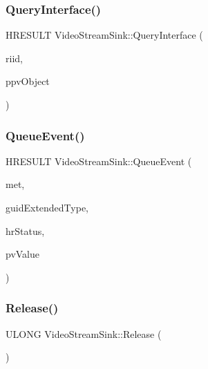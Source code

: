 \mbox{\label{class_video_stream_sink_aab479e5acecb695b0fdc04116ea4b985}} 
\subsubsection{\texorpdfstring{Query\+Interface()}{QueryInterface()}}
{\footnotesize\ttfamily H\+R\+E\+S\+U\+LT Video\+Stream\+Sink\+::\+Query\+Interface (\begin{DoxyParamCaption}\item[{R\+E\+F\+I\+ID}]{riid,  }\item[{void $\ast$$\ast$}]{ppv\+Object }\end{DoxyParamCaption})\hspace{0.3cm}{\ttfamily [override]}}

\mbox{\label{class_video_stream_sink_a272af1cbaa67351da651a86d1fedbf64}} 
\subsubsection{\texorpdfstring{Queue\+Event()}{QueueEvent()}}
{\footnotesize\ttfamily H\+R\+E\+S\+U\+LT Video\+Stream\+Sink\+::\+Queue\+Event (\begin{DoxyParamCaption}\item[{Media\+Event\+Type}]{met,  }\item[{R\+E\+F\+G\+U\+ID}]{guid\+Extended\+Type,  }\item[{H\+R\+E\+S\+U\+LT}]{hr\+Status,  }\item[{const P\+R\+O\+P\+V\+A\+R\+I\+A\+NT $\ast$}]{pv\+Value }\end{DoxyParamCaption})\hspace{0.3cm}{\ttfamily [override]}}

\mbox{\label{class_video_stream_sink_a67891df0d73723ad9855133edb1eda2a}} 
\subsubsection{\texorpdfstring{Release()}{Release()}}
{\footnotesize\ttfamily U\+L\+O\+NG Video\+Stream\+Sink\+::\+Release (\begin{DoxyParamCaption}{ }\end{DoxyParamCaption})\hspace{0.3cm}{\ttfamily [override]}}

